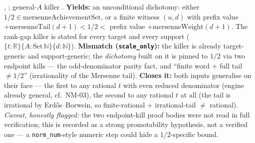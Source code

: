 \begin{obs} 
,
;
general-$A$ killer .
\textbf{Yields:} an unconditional dichotomy: either $1/2\in\mathrm{mersenneAchievementSet}$, or a
finite witness $(u,d)$ with prefix value $+\mathrm{mersenneTail}(d{+}1) < 1/2 <$ prefix value
$+\mathrm{mersenneWeight}(d{+}1)$. The rank-gap killer is stated for every target and every
support ($\{t:\mathbb R\}\{A:\mathrm{Set}\,\mathbb N\}\{d:\mathbb N\}$).
\textbf{Mismatch (\texttt{scale\_only}):} the killer is already target-generic and
support-generic; the \emph{dichotomy} built on it is pinned to $1/2$ via two endpoint kills — the
odd-denominator parity fact, and ``finite word + full tail $\ne 1/2$'' (irrationality of the
Mersenne tail).
\textbf{Closes it:} both inputs generalise on their face — the first to any rational $t$ with
even reduced denominator (engine already general, cf.\ NM-03), the second to any rational $t$ at
all (the tail is irrational by Erdős--Borwein, so finite-rational + irrational-tail $\ne$
rational). \emph{Caveat, honestly flagged:} the two endpoint-kill proof bodies were not read in
full verification; this is recorded as a strong promotability hypothesis, not a verified one — a
\texttt{norm\_num}-style numeric step could hide a $1/2$-specific bound.
\end{obs}

